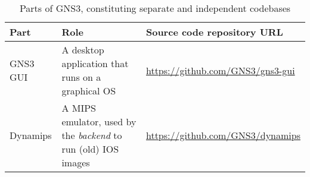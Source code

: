 \begin{table}
  \centering
  \small
  \begin{tabulary}{0.8\textwidth}{lLL}
    \toprule
      \textbf{Part}  & \textbf{Role}                                                       & \textbf{Source code repository URL}\\
    \midrule
      GNS3 GUI       & A desktop application that runs on a graphical OS                   & \scriptsize\url{https://github.com/GNS3/gns3-gui}\\
      Dynamips       & A MIPS emulator, used by the \emph{backend} to run (old) IOS images & \scriptsize\url{https://github.com/GNS3/dynamips}\\
    \bottomrule
  \end{tabulary}
  \caption{%
    Parts of GNS3, constituting separate and independent codebases
  }
  \label{tab:gns3components}
\end{table}
